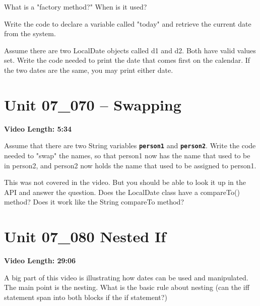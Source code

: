 \documentclass[letterpaper,12pt]{exam}
\newcommand{\unit}{Unit 07}
\begin{document}
\begin{questions}
\begin{samepage}
    \question What is a "factory method?"  When is it used?
    \vspace{5mm}
\end{samepage}
\begin{samepage}
    \question Write the code to declare a variable called "today" and retrieve the current date from the system.
    \vspace{5mm}
\end{samepage}
\begin{samepage}
    \question Assume there are two LocalDate objects called d1 and d2.  Both have valid values set.  Write the code needed to print the date that comes first on the calendar.  If the two dates are the same, you may print either date.
    \vspace{25mm}
\end{samepage}



\section*{\unit\_070 -- Swapping} %
\noindent \textbf{Video Length: 5:34}

\begin{samepage}
    \question Assume that there are two String variables \texttt{\textbf{person1}} and \texttt{\textbf{person2}}. Write the code needed to "swap" the names, so that person1 now has the name that used to be in person2, and person2 now holds the name that used to be assigned to person1.  
    \vspace{5mm}
\end{samepage}

\begin{samepage}
    \question This was not covered in the video.  But you should be able to look it up in the API and answer the question.  Does the LocalDate class have a compareTo() method?  Does it work like the String compareTo method?
    \vspace{5mm}
\end{samepage}


\section*{\unit\_080 Nested If} %
\noindent \textbf{Video Length: 29:06}
\begin{samepage}
    \question A big part of this video is illustrating how dates can be used and manipulated.  The main point is the nesting.  What is the basic rule about nesting (can the iff statement span into both blocks if the if statement?)
    \vspace{5mm}
\end{samepage}


\end{questions}
\end{document}
